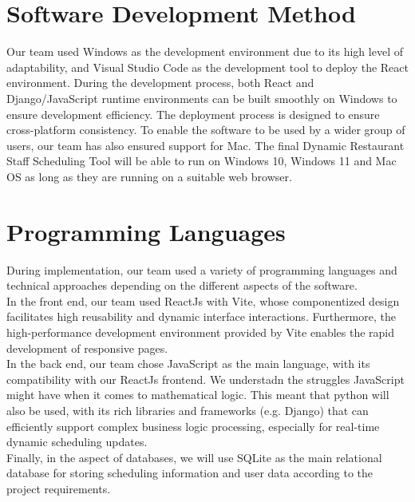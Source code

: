 \documentclass[a4paper,12pt, oneside]{report}
\begin{document}
\section{Software Development Method}
Our team used Windows as the development environment due to its high level of adaptability, and Visual Studio Code as the development tool to deploy the React environment. During the development process, both React and Django/JavaScript runtime environments can be built smoothly on Windows to ensure development efficiency. The deployment process is designed to ensure cross-platform consistency. To enable the software to be used by a wider group of users, our team has also ensured support for Mac. The final Dynamic Restaurant Staff Scheduling Tool will be able to run on Windows 10, Windows 11 and Mac OS as long as they are running on a suitable web browser.\\

\section{Programming Languages}
\label{sec:programming-languages}
During implementation, our team used a variety of programming languages and technical approaches depending on the different aspects of the software.\\

In the front end, our team used ReactJs with Vite, whose componentized design facilitates high reusability and dynamic interface interactions. Furthermore, the high-performance development environment provided by Vite enables the rapid development of responsive pages. \\

In the back end, our team chose JavaScript as the main language, with its compatibility with our ReactJs frontend. We understadn the struggles JavaScript might have when it comes to mathematical logic. This meant that python will also be used, with its rich libraries and frameworks (e.g. Django) that can efficiently support complex business logic processing, especially for real-time dynamic scheduling updates.\\

Finally, in the aspect of databases, we will use SQLite as the main relational database for storing scheduling information and user data according to the project requirements.\\
\end{document}
